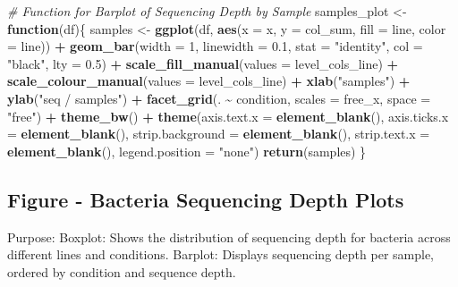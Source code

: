 \documentclass[
  11pt,
]{article}
\newenvironment{Shaded}{\begin{snugshade}}{\end{snugshade}}
\newcommand{\AttributeTok}[1]{\textcolor[rgb]{0.13,0.29,0.53}{#1}}
\newcommand{\CommentTok}[1]{\textcolor[rgb]{0.56,0.35,0.01}{\textit{#1}}}
\newcommand{\ControlFlowTok}[1]{\textcolor[rgb]{0.13,0.29,0.53}{\textbf{#1}}}
\newcommand{\DecValTok}[1]{\textcolor[rgb]{0.00,0.00,0.81}{#1}}
\newcommand{\FloatTok}[1]{\textcolor[rgb]{0.00,0.00,0.81}{#1}}
\newcommand{\FunctionTok}[1]{\textcolor[rgb]{0.13,0.29,0.53}{\textbf{#1}}}
\newcommand{\NormalTok}[1]{#1}
\newcommand{\OtherTok}[1]{\textcolor[rgb]{0.56,0.35,0.01}{#1}}
\newcommand{\SpecialCharTok}[1]{\textcolor[rgb]{0.81,0.36,0.00}{\textbf{#1}}}
\newcommand{\StringTok}[1]{\textcolor[rgb]{0.31,0.60,0.02}{#1}}
\begin{document}
\begin{Shaded}
\begin{Highlighting}[]
\CommentTok{\# Function for Barplot of Sequencing Depth by Sample}
\NormalTok{samples\_plot }\OtherTok{\textless{}{-}} \ControlFlowTok{function}\NormalTok{(df)\{}
\NormalTok{  samples }\OtherTok{\textless{}{-}} \FunctionTok{ggplot}\NormalTok{(df, }\FunctionTok{aes}\NormalTok{(}\AttributeTok{x =}\NormalTok{ x, }\AttributeTok{y =}\NormalTok{ col\_sum, }\AttributeTok{fill =}\NormalTok{ line, }\AttributeTok{color =}\NormalTok{ line)) }\SpecialCharTok{+}
               \FunctionTok{geom\_bar}\NormalTok{(}\AttributeTok{width =} \DecValTok{1}\NormalTok{, }\AttributeTok{linewidth =} \FloatTok{0.1}\NormalTok{, }\AttributeTok{stat =} \StringTok{"identity"}\NormalTok{, }\AttributeTok{col =} \StringTok{"black"}\NormalTok{, }\AttributeTok{lty =} \FloatTok{0.5}\NormalTok{) }\SpecialCharTok{+}
               \FunctionTok{scale\_fill\_manual}\NormalTok{(}\AttributeTok{values =}\NormalTok{ level\_cols\_line) }\SpecialCharTok{+}
               \FunctionTok{scale\_colour\_manual}\NormalTok{(}\AttributeTok{values =}\NormalTok{ level\_cols\_line) }\SpecialCharTok{+}
               \FunctionTok{xlab}\NormalTok{(}\StringTok{"samples"}\NormalTok{) }\SpecialCharTok{+}
               \FunctionTok{ylab}\NormalTok{(}\StringTok{"seq / samples"}\NormalTok{) }\SpecialCharTok{+}
               \FunctionTok{facet\_grid}\NormalTok{(. }\SpecialCharTok{\textasciitilde{}}\NormalTok{ condition, }\AttributeTok{scales =} \StringTok{\textquotesingle{}free\_x\textquotesingle{}}\NormalTok{, }\AttributeTok{space =} \StringTok{"free"}\NormalTok{) }\SpecialCharTok{+}
               \FunctionTok{theme\_bw}\NormalTok{() }\SpecialCharTok{+}
               \FunctionTok{theme}\NormalTok{(}\AttributeTok{axis.text.x =} \FunctionTok{element\_blank}\NormalTok{(), }\AttributeTok{axis.ticks.x =} \FunctionTok{element\_blank}\NormalTok{(),}
                     \AttributeTok{strip.background =} \FunctionTok{element\_blank}\NormalTok{(), }\AttributeTok{strip.text.x =} \FunctionTok{element\_blank}\NormalTok{(),}
                     \AttributeTok{legend.position =} \StringTok{"none"}\NormalTok{)}
  \FunctionTok{return}\NormalTok{(samples)}
\NormalTok{\}}
\end{Highlighting}
\end{Shaded}

\subsection{Figure - Bacteria Sequencing Depth
Plots}\label{figure---bacteria-sequencing-depth-plots}

Purpose: Boxplot: Shows the distribution of sequencing depth for
bacteria across different lines and conditions. Barplot: Displays
sequencing depth per sample, ordered by condition and sequence depth.
\end{document}

